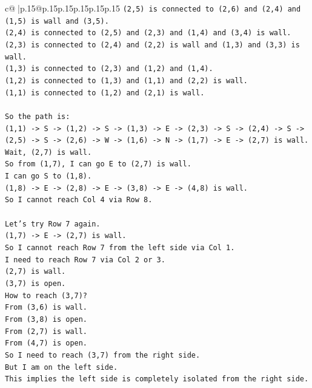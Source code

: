 \documentclass{article}
\begin{document}
{\begin{supertabular}{c@{$\;$}|p{.15\linewidth}@{}p{.15\linewidth}p{.15\linewidth}p{.15\linewidth}p{.15\linewidth}p{.15\linewidth}}
{{{\texttt{(2,5) is connected to (2,6) and (2,4) and (1,5) is wall and (3,5).} \\
\texttt{(2,4) is connected to (2,5) and (2,3) and (1,4) and (3,4) is wall.} \\
\texttt{(2,3) is connected to (2,4) and (2,2) is wall and (1,3) and (3,3) is wall.} \\
\texttt{(1,3) is connected to (2,3) and (1,2) and (1,4).} \\
\texttt{(1,2) is connected to (1,3) and (1,1) and (2,2) is wall.} \\
\texttt{(1,1) is connected to (1,2) and (2,1) is wall.} \\
\\ 
\texttt{So the path is:} \\
\texttt{(1,1) {-}> S {-}> (1,2) {-}> S {-}> (1,3) {-}> E {-}> (2,3) {-}> S {-}> (2,4) {-}> S {-}> (2,5) {-}> S {-}> (2,6) {-}> W {-}> (1,6) {-}> N {-}> (1,7) {-}> E {-}> (2,7) is wall.} \\
\texttt{Wait, (2,7) is wall.} \\
\texttt{So from (1,7), I can go E to (2,7) is wall.} \\
\texttt{I can go S to (1,8).} \\
\texttt{(1,8) {-}> E {-}> (2,8) {-}> E {-}> (3,8) {-}> E {-}> (4,8) is wall.} \\
\texttt{So I cannot reach Col 4 via Row 8.} \\
\\ 
\texttt{Let's try Row 7 again.} \\
\texttt{(1,7) {-}> E {-}> (2,7) is wall.} \\
\texttt{So I cannot reach Row 7 from the left side via Col 1.} \\
\texttt{I need to reach Row 7 via Col 2 or 3.} \\
\texttt{(2,7) is wall.} \\
\texttt{(3,7) is open.} \\
\texttt{How to reach (3,7)?} \\
\texttt{From (3,6) is wall.} \\
\texttt{From (3,8) is open.} \\
\texttt{From (2,7) is wall.} \\
\texttt{From (4,7) is open.} \\
\texttt{So I need to reach (3,7) from the right side.} \\
\texttt{But I am on the left side.} \\
\texttt{This implies the left side is completely isolated from the right side.} \\
}}}
\end{supertabular}}
\end{document}
